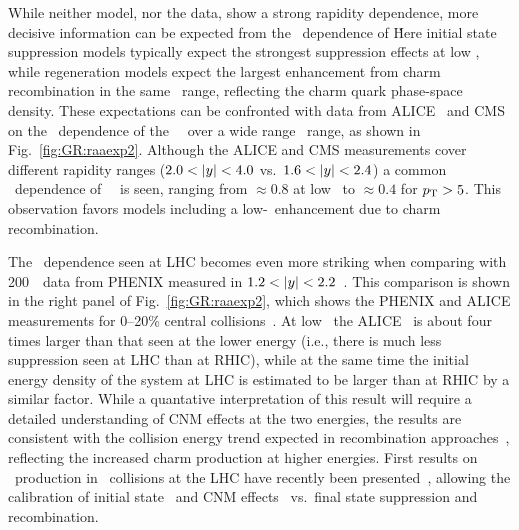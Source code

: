 While neither model, nor the data, show a strong rapidity dependence, more decisive 
information can be expected from the \pT\ dependence of \Raa\. Here initial state 
suppression models typically expect the strongest suppression effects at low \pT, while 
regeneration models expect the largest enhancement from charm recombination in the same \pT\ range,
reflecting the charm quark phase-space density.
These expectations can be confronted with data from ALICE~\cite{Abelev:2013ila} and CMS~\cite{Chatrchyan:2012np} on the \pT\ dependence of the 
\jpsi\ \Raa\ over a wide range \pT\  range, as shown in Fig.~\ref{fig:GR:raaexp2}. 
Although the ALICE and CMS measurements cover different rapidity ranges ($2.0 < |y| < 4.0$ vs.\ $ 1.6  < |y| < 2.4 $)
a common \pT\ dependence of \jpsi\ \Raa\ is seen, ranging from $\approx 0.8$ 
at low \pT\ to $\approx 0.4$ for $\mbox{$p_{\mathrm{T}}$} > 5$\GeVc.
This observation favors models including a low-\pT\ enhancement due to charm recombination.

The \pT\ dependence seen at LHC becomes even more striking when comparing with  200\GeV\ \AuAu\ 
data from PHENIX measured in $1.2 < |y| < 2.2$~\cite{Adare:2011yf}. This comparison is shown 
in the right panel of Fig.~\ref{fig:GR:raaexp2}, which shows the PHENIX and 
ALICE measurements for 0--20\% central collisions~\cite{Abelev:2013ila}.
At low \pT\ the ALICE \Raa\ is about four times larger than that seen at the lower energy (i.e.,
there is much less suppression seen at LHC than at RHIC), while
at the same time the initial energy density of the system at LHC is estimated to be larger than at
RHIC by a similar factor. While a quantative interpretation of this result will require
a detailed understanding of CNM effects at the two energies, the results are  consistent
with the collision energy trend expected in recombination 
approaches~\cite{Zhao:2007hh,Zhou:2013aea,Liu:2009nb,Zhao:2010nk}, reflecting the
increased charm production at higher energies.
First results on \jpsi\ production in \pPb\ collisions at the LHC have recently
been presented~\cite{Abelev:2013yxa,Aaij:2013zxa}, allowing
the calibration of initial state~\cite{Albacete:2014fwa} and CNM effects~\cite{Brandt:2014vva} 
vs.\ final state suppression and recombination.

